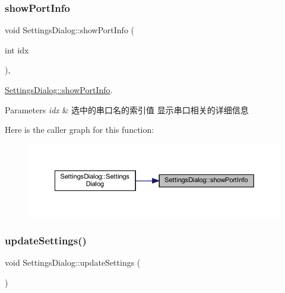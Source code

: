 \subsubsection{\texorpdfstring{showPortInfo}{showPortInfo}}
{\footnotesize\ttfamily void Settings\+Dialog\+::show\+Port\+Info (\begin{DoxyParamCaption}\item[{int}]{idx }\end{DoxyParamCaption})\hspace{0.3cm}{\ttfamily [private]}, {\ttfamily [slot]}}



\mbox{\hyperlink{class_settings_dialog_a70f6f67b5f5e3af21d011fa90c2b2098}{Settings\+Dialog\+::show\+Port\+Info}}. 


\begin{DoxyParams}{Parameters}
{\em idx} & 选中的串口名的索引值 显示串口相关的详细信息 \\
\hline
\end{DoxyParams}
Here is the caller graph for this function\+:
\nopagebreak
\begin{figure}[H]
\begin{center}
\leavevmode
\includegraphics[width=350pt]{class_settings_dialog_a70f6f67b5f5e3af21d011fa90c2b2098_icgraph}
\end{center}
\end{figure}
\mbox{\label{class_settings_dialog_a349c9a5d2af7bb8001df096b43786d2d}} 
\subsubsection{\texorpdfstring{updateSettings()}{updateSettings()}}
{\footnotesize\ttfamily void Settings\+Dialog\+::update\+Settings (\begin{DoxyParamCaption}{ }\end{DoxyParamCaption})\hspace{0.3cm}{\ttfamily [private]}}



